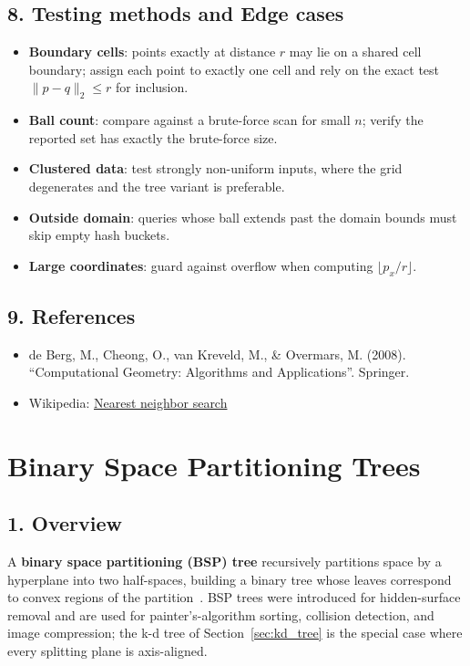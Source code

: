 \subsection{8. Testing methods and Edge cases}
\begin{itemize}
    \item \textbf{Boundary cells}: points exactly at distance $r$ may lie on a
      shared cell boundary; assign each point to exactly one cell and rely on
      the exact test $\|p - q\|_2 \le r$ for inclusion.
    \item \textbf{Ball count}: compare against a brute-force scan for small
      $n$; verify the reported set has exactly the brute-force size.
    \item \textbf{Clustered data}: test strongly non-uniform inputs, where the
      grid degenerates and the tree variant is preferable.
    \item \textbf{Outside domain}: queries whose ball extends past the domain
      bounds must skip empty hash buckets.
    \item \textbf{Large coordinates}: guard against overflow when computing
      $\lfloor p_x / r \rfloor$.
\end{itemize}

\subsection{9. References}
\begin{itemize}
    \item de Berg, M., Cheong, O., van Kreveld, M., \& Overmars, M. (2008).
      ``Computational Geometry: Algorithms and Applications''. Springer.
    \item Wikipedia: \href{https://en.wikipedia.org/wiki/Nearest_neighbor_search}
      {Nearest neighbor search}
\end{itemize}

\section{Binary Space Partitioning Trees}
\label{sec:bsp_trees}

\subsection{1. Overview}
A \textbf{binary space partitioning (BSP) tree} recursively partitions space by a hyperplane into two half-spaces, building a binary tree whose leaves correspond to convex regions of the partition~\cite{fuchs1980}. BSP trees were introduced for hidden-surface removal and are used for painter's-algorithm sorting, collision detection, and image compression; the k-d tree of Section~\ref{sec:kd_tree} is the special case where every splitting plane is axis-aligned.


